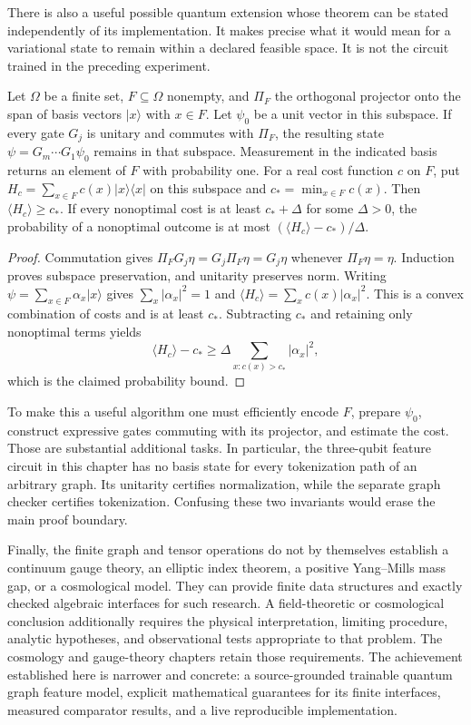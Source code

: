 There is also a useful possible quantum extension whose theorem can be
stated independently of its implementation. It makes precise what it
would mean for a variational state to remain within a declared feasible
space. It is not the circuit trained in the preceding experiment.

\begin{proposition}
\label{qt:feasible-hilbert}
Let $\Omega$ be a finite set, $F\subseteq\Omega$ nonempty, and
$\Pi_F$ the orthogonal projector onto the span of basis vectors
$|x\rangle$ with $x\in F$. Let $\psi_0$ be a unit vector in this subspace.
If every gate $G_j$ is unitary and commutes with $\Pi_F$, the resulting
state $\psi=G_m\cdots G_1\psi_0$ remains in that subspace. Measurement in
the indicated basis returns an element of $F$ with probability one.
For a real cost function $c$ on $F$, put
$H_c=\sum_{x\in F}c(x)|x\rangle\langle x|$ on this subspace and
$c_* =\min_{x\in F}c(x)$. Then
$\langle H_c\rangle\geq c_*$. If every nonoptimal cost is at least
$c_*+\Delta$ for some $\Delta>0$, the probability of a nonoptimal outcome
is at most $(\langle H_c\rangle-c_*)/\Delta$.
\end{proposition}
\begin{proof}
Commutation gives
$\Pi_F G_j\eta=G_j\Pi_F\eta=G_j\eta$ whenever $\Pi_F\eta=\eta$.
Induction proves subspace preservation, and unitarity preserves norm.
Writing $\psi=\sum_{x\in F}\alpha_x|x\rangle$ gives
$\sum_x|\alpha_x|^2=1$ and
$\langle H_c\rangle=\sum_x c(x)|\alpha_x|^2$.
This is a convex combination of costs and is at least $c_*$.
Subtracting $c_*$ and retaining only nonoptimal terms yields
\[
 \langle H_c\rangle-c_*
 \geq\Delta\sum_{x:c(x)>c_*}|\alpha_x|^2,
\]
which is the claimed probability bound.
\end{proof}

To make this a useful algorithm one must efficiently encode $F$, prepare
$\psi_0$, construct expressive gates commuting with its projector, and
estimate the cost. Those are substantial additional tasks. In particular,
the three-qubit feature circuit in this chapter has no basis state for
every tokenization path of an arbitrary graph. Its unitarity certifies
normalization, while the separate graph checker certifies tokenization.
Confusing these two invariants would erase the main proof boundary.

Finally, the finite graph and tensor operations do not by themselves
establish a continuum gauge theory, an elliptic index theorem, a positive
Yang--Mills mass gap, or a cosmological model. They can provide finite
data structures and exactly checked algebraic interfaces for such
research. A field-theoretic or cosmological conclusion additionally
requires the physical interpretation, limiting procedure, analytic
hypotheses, and observational tests appropriate to that problem. The
cosmology and gauge-theory chapters retain those requirements. The
achievement established here is narrower and concrete: a source-grounded
trainable quantum graph feature model, explicit mathematical guarantees
for its finite interfaces, measured comparator results, and a live
reproducible implementation.


